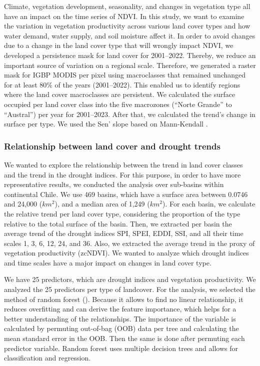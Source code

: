 \documentclass[
  authoryear,
  preprint,
  3p,
  onecolumn]{elsarticle}
\begin{document}
Climate, vegetation development, seasonality, and changes in vegetation
type all have an impact on the time series of NDVI. In this study, we
want to examine the variation in vegetation productivity across various
land cover types and how water demand, water supply, and soil moisture
affect it. In order to avoid changes due to a change in the land cover
type that will wrongly impact NDVI, we developed a persistence mask for
land cover for 2001--2022. Thereby, we reduce an important source of
variation on a regional scale. Therefore, we generated a raster mask for
IGBP MODIS per pixel using macroclasses that remained unchanged for at
least 80\% of the years (2001--2022). This enabled us to identify
regions where the land cover macroclasses are persistent. We calculated
the surface occupied per land cover class into the five macrozones
(``Norte Grande'' to ``Austral'') per year for 2001--2023. After that,
we calculated the trend's change in surface per type. We used the Sen'
slope \citep{Sen1968} based on Mann-Kendall \citep{Kendall1975}.

\hypertarget{relationship-between-land-cover-and-drought-trends}{%
\subsubsection{Relationship between land cover and drought
trends}\label{relationship-between-land-cover-and-drought-trends}}

We wanted to explore the relationship between the trend in land cover
classes and the trend in the drought indices. For this purpose, in order
to have more representative results, we conducted the analysis over
sub-basins within continental Chile. We use 469 basins, which have a
surface area between 0.0746 and 24,000 (\(km^2\)), and a median area of
1,249 (\(km^2\)). For each basin, we calculate the relative trend per
land cover type, considering the proportion of the type relative to the
total surface of the basin. Then, we extracted per basin the average
trend of the drought indices SPI, SPEI, EDDI, SSI, and all their time
scales 1, 3, 6, 12, 24, and 36. Also, we extracted the average trend in
the proxy of vegetation productivity (zcNDVI). We wanted to analyze
which drought indices and time scales have a major impact on changes in
land cover type.

We have 25 predictors, which are drought indices and vegetation
productivity. We analyzed the 25 predictors per type of landcover. For
the analysis, we selected the method of random forest (\citet{Ho1995}).
Because it allows to find no linear relationship, it reduces overfitting
and can derive the feature importance, which helps for a better
understanding of the relationships. The importance of the variable is
calculated by permuting out-of-bag (OOB) data per tree and calculating
the mean standard error in the OOB. Then the same is done after
permuting each predictor variable. Random forest uses multiple decision
trees and allows for classification and regression.
\end{document}
